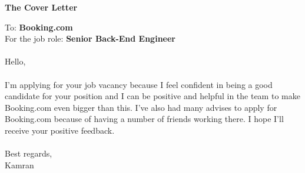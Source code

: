 \documentclass[10pt,a4paper]{article}
\begin{document}
\noindent \textbf{The Cover Letter}

\vspace{3cm}

\noindent To: \textbf{Booking.com} \\
For the job role: \textbf{Senior Back-End Engineer} \\ \\

\noindent Hello, \\ \\

\noindent I'm applying for your job vacancy because I feel confident in being a good candidate for your position and I can be positive and helpful in the team to make Booking.com even bigger than this. I've also had many advises to apply for Booking.com because of having a number of friends working there. I hope I'll receive your positive feedback. \\ \\

\noindent Best regards, \\
\noindent Kamran
\end{document}
